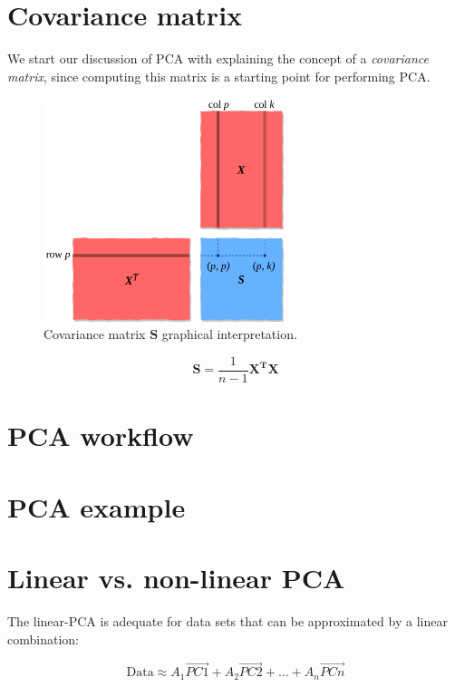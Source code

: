 \documentclass[10pt,twocolumn]{article}
\begin{document}
\section{Covariance matrix}

We start our discussion of PCA with explaining the concept of a \textit{covariance matrix}, since computing this matrix is a starting point for performing PCA.

\begin{figure}[H]
\centering\includegraphics[width=7cm]{cov-matrix.png}
\caption{Covariance matrix $\bm{S}$ graphical interpretation.}
\label{fig:covariance-matrix}
\end{figure}


\begin{equation}
\bm{S} = \frac{1}{n-1} \bm{X^T} \bm{X}
\end{equation}


\section{PCA workflow}





\section{PCA example}

\section{Linear vs. non-linear PCA}

The linear-PCA is adequate for data sets that can be approximated by a linear combination:

\begin{equation}
\text{Data} \approx A_1 \vec{PC1} + A_2 \vec{PC2} + \dots + A_n \vec{PCn}
\end{equation}
\end{document}
